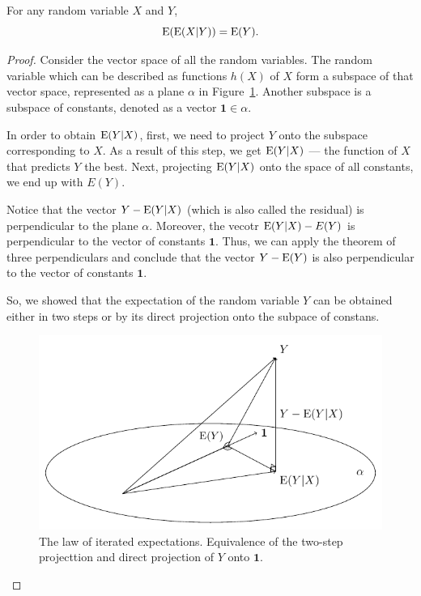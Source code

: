 
\begin{theorem}
For any random variable $X$ and $Y$,
\[
\operatorname{E}(\operatorname{E}(X|Y)) = \operatorname{E}(Y).
\]
\end{theorem}

\begin{proof}

Consider the vector space of all the random variables.  The random variable
which can be described as functions $h(X)$ of $X$ form a subspace of that vector
space, represented as a plane $\alpha$ in Figure~\ref{fig:adams}.
Another subspace is a subspace of constants, denoted as a vector $\mathbf{1} \in \alpha$.

In order to obtain $\operatorname{E}(Y|X)$, first, we need to project $Y$ onto the subspace
corresponding to $X$. As a result of this step, we get $\operatorname{E}(Y|X)$ — the function
of $X$ that predicts $Y$ the best. Next, projecting $\operatorname{E}(Y|X)$ onto the space
of all constants, we end up with $E(Y)$.

Notice that the vector $Y - \operatorname{E}(Y|X)$ (which is also called the residual) is
perpendicular to the plane $\alpha$. Moreover, the vecotr $\operatorname{E}(Y|X) - E(Y)$ is
perpendicular to the vector of constants $\mathbf{1}$. Thus, we can apply
the theorem of three perpendiculars and conclude that the vector $Y - \operatorname{E}(Y)$ is
also perpendicular to the vector of constants $\mathbf{1}$.

So, we showed that the expectation of the random variable $Y$ can be obtained either
in two steps or by its direct projection onto the subpace of constans.

\begin{figure}[h!]
\begin{center}
\includegraphics[width=0.6\linewidth]{figures/01_law_of_iterated_expectations.pdf}
\caption{The law of iterated expectations. Equivalence of the two-step projecttion
and direct projection of $Y$ onto $\mathbf{1}$.}
\label{fig:adams}
\end{center}
\end{figure}

\end{proof}


